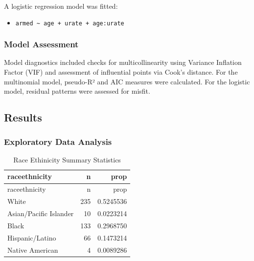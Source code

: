 \documentclass[
  letterpaper,
  DIV=11,
  numbers=noendperiod]{scrartcl}
\providecommand{\tightlist}{%
  \setlength{\itemsep}{0pt}\setlength{\parskip}{0pt}}\usepackage{longtable,booktabs,array}
\begin{document}
A logistic regression model was fitted:

\begin{itemize}
\tightlist
\item
  \texttt{armed\ \textasciitilde{}\ age\ +\ urate\ +\ age:urate}
\end{itemize}

\subsubsection{Model Assessment}\label{model-assessment}

Model diagnostics included checks for multicollinearity using Variance
Inflation Factor (VIF) and assessment of influential points via Cook's
distance. For the multinomial model, pseudo-R² and AIC measures were
calculated. For the logistic model, residual patterns were assessed for
misfit.

\subsection{Results}\label{results}

\subsubsection{Exploratory Data
Analysis}\label{exploratory-data-analysis}

\begin{longtable}[]{@{}lrr@{}}
\caption{Race Ethinicity Summary Statistics}\tabularnewline
\toprule\noalign{}
raceethnicity & n & prop \\
\midrule\noalign{}
\endfirsthead
\toprule\noalign{}
raceethnicity & n & prop \\
\midrule\noalign{}
\endhead
\bottomrule\noalign{}
\endlastfoot
White & 235 & 0.5245536 \\
Asian/Pacific Islander & 10 & 0.0223214 \\
Black & 133 & 0.2968750 \\
Hispanic/Latino & 66 & 0.1473214 \\
Native American & 4 & 0.0089286 \\
\end{longtable}
\end{document}
